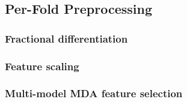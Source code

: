 \documentclass[12pt,a4paper,oneside]{article}
\begin{document}
\subsection{Per-Fold Preprocessing}\label{subsec:preprocessing}



\subsubsection{Fractional differentiation}\label{subsubsec:ffd}

%
%
%
%


\subsubsection{Feature scaling}\label{subsubsec:scaling}



\subsubsection{Multi-model MDA feature selection}\label{subsubsec:mda}
\end{document}
